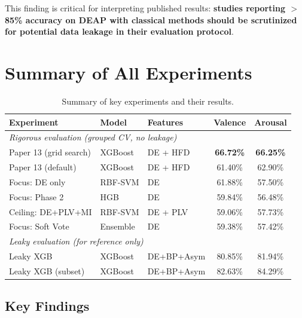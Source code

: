 \documentclass[12pt,a4paper]{report}
\begin{document}
This finding is critical for interpreting published results: \textbf{studies
reporting $>$85\% accuracy on DEAP with classical methods should be scrutinized
for potential data leakage in their evaluation protocol}.


\section{Summary of All Experiments}
\label{sec:exp_summary}

\begin{table}[H]
\centering
\caption{Summary of key experiments and their results.}
\label{tab:all_experiments}
\begin{tabular}{p{4cm}llcc}
\toprule
\textbf{Experiment} & \textbf{Model} & \textbf{Features} & \textbf{Valence} & \textbf{Arousal} \\
\midrule
\multicolumn{5}{l}{\textit{Rigorous evaluation (grouped CV, no leakage)}} \\
\midrule
Paper 13 (grid search) & XGBoost & DE + HFD & \textbf{66.72\%} & \textbf{66.25\%} \\
Paper 13 (default) & XGBoost & DE + HFD & 61.40\% & 62.90\% \\
Focus: DE only & RBF-SVM & DE & 61.88\% & 57.50\% \\
Focus: Phase 2 & HGB & DE & 59.84\% & 56.48\% \\
Ceiling: DE+PLV+MI & RBF-SVM & DE + PLV & 59.06\% & 57.73\% \\
Focus: Soft Vote & Ensemble & DE & 59.38\% & 57.42\% \\
\midrule
\multicolumn{5}{l}{\textit{Leaky evaluation (for reference only)}} \\
\midrule
Leaky XGB & XGBoost & DE+BP+Asym & 80.85\% & 81.94\% \\
Leaky XGB (subset) & XGBoost & DE+BP+Asym & 82.63\% & 84.29\% \\
\bottomrule
\end{tabular}
\end{table}

\subsection{Key Findings}
\end{document}
